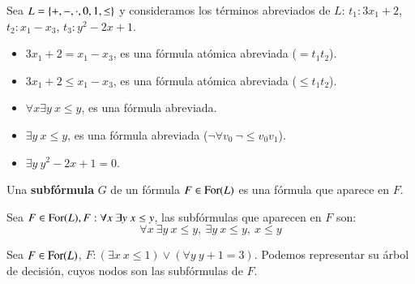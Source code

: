 \begin{eg}
    Sea $L = \left\{+, -, \cdot, 0, 1, \leq\right\}$  y consideramos los términos abreviados de $L$: $t_1: 3x_1+2$, $t_2: x_1-x_3$, $t_3: y^2-2x+1$.
    \begin{itemize}
        \item $3x_1 + 2 = x_1 - x_3$, es una fórmula atómica abreviada ($= t_1 t_2$).
        \item $3x_1 + 2 \leq x_1 - x_3$, es una fórmula atómica abreviada ($\leq t_1 t_2$).
        \item $\forall x \exists y\ x\leq y$, es una fórmula abreviada.
        \item $\exists y\ x \leq y$, es una fórmula abreviada ($\neg \forall v_0\ \neg \leq v_0 v_1$).
        \item $\exists y\ y^2-2x+1 = 0$.
    \end{itemize}
\end{eg}

\begin{dfn}[Subfórmula]
    Una \textbf{subfórmula} $G$ de un fórmula $F \in \mathrm{For}(L)$ es una fórmula que aparece en $F$.
\end{dfn}

\begin{eg}
    Sea $F \in \mathrm{For}(L), F: \forall x\ \exists y\ x\leq y$, las subfórmulas que aparecen en $F$ son:
    $$
        \forall x\ \exists y\ x\leq y,\ \exists y\ x\leq y,\ x\leq y
    $$
\end{eg}

\begin{eg}
    Sea $F \in  \mathrm{For}(L)$, $F: (\exists x\ x\leq 1) \lor (\forall y\ y+1=3)$. Podemos representar su árbol de decisión, cuyos nodos son las subfórmulas de $F$.\\
    \begin{center}
    \end{center}
\end{eg}


